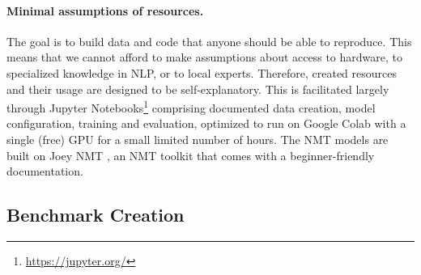 \documentclass{article} %
\begin{document}
\paragraph{Minimal assumptions of resources.} The goal is to build data and code that anyone should be able to reproduce. This means that we cannot afford to make assumptions about access to hardware, to specialized knowledge in NLP, or to local experts. Therefore, created resources and their usage are designed to be self-explanatory. This is facilitated largely through Jupyter Notebooks\footnote{\url{https://jupyter.org/}} comprising documented data creation, model configuration, training and evaluation, optimized to run on Google Colab with a single (free) GPU for a small limited number of hours. The NMT models are built on Joey NMT \citep{joey2019}, an NMT toolkit that comes with a beginner-friendly documentation. %

\subsection{Benchmark Creation}
\label{subsec:benchmarkcreation}
\end{document}
